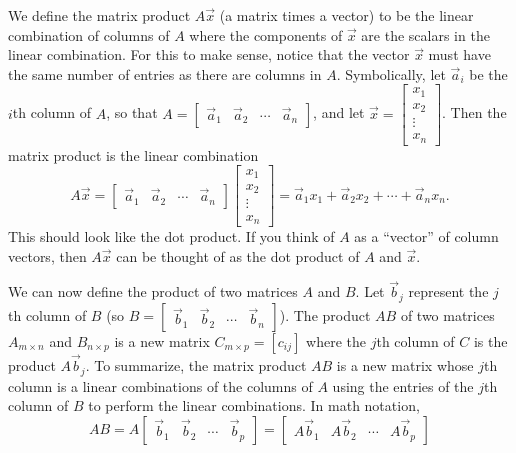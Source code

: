We define the matrix product $A\vec x$ (a matrix times a vector) to be the linear combination of columns of $A$ where the components of $\vec x$ are the scalars in the linear combination. 
For this to make sense, notice that the vector $\vec x$ must have the same number of entries as there are columns in $A$. 
Symbolically, let $\vec a_i$ be the $i$th column of $A$, so that 
$A = \begin{bmatrix}\vec a_1 & \vec a_2 &\cdots &\vec a_n\end{bmatrix}$, 
and let $\vec x = \begin{bmatrix}x_1\\x_2\\ \vdots \\ x_n\end{bmatrix}$. Then the matrix product is the linear combination 
$$A\vec x 
=\begin{bmatrix}\vec a_1 & \vec a_2 &\cdots &\vec a_n\end{bmatrix}\begin{bmatrix}x_1\\x_2\\ \vdots \\ x_n\end{bmatrix}
= \vec a_1 x_1+\vec a_2 x_2+\cdots +\vec a_n x_n.$$ This should look like the dot product. If you think of $A$ as a ``vector'' of column vectors, then $A\vec x$ can be thought of as the dot product of $A$ and $\vec x$.  

We can now define the product of two matrices $A$ and $B$.  
Let $\vec b_j$ represent the $j$th column of $B$ (so $B = \begin{bmatrix}\vec b_1 & \vec b_2 &\cdots &\vec b_n\end{bmatrix}$).  The product $AB$ of two matrices {$A_{m\times n}$} and {$B_{n\times p}$} is a new matrix {$C_{m\times p}=[c_{ij}]$} where the $j$th column of $C$ is the product $A\vec b_j$.  To summarize, the matrix product $AB$ is a new matrix whose $j$th column is a linear combinations of the columns of $A$ using the entries of the $j$th column of $B$ to perform the linear combinations.  In math notation,\begin{equation*}
AB 
=A\begin{bmatrix}\vec b_1 & \vec b_2 &\cdots &\vec b_p\end{bmatrix}=\begin{bmatrix}A\vec b_1 & A\vec b_2 &\cdots & A\vec b_p\end{bmatrix}
\end{equation*}


